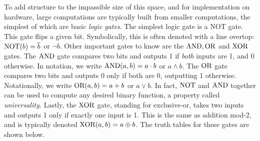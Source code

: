 \documentclass{article}
\newcommand{\NOT}{\ensuremath\text{NOT}}
\newcommand{\AND}{\ensuremath\text{AND}}
\newcommand{\OR}{\ensuremath\text{OR}}
\newcommand{\XOR}{\ensuremath\text{XOR}}
\begin{document}
To add structure to the impassible size of this space, and for implementation on hardware, large computations are typically built from smaller computations, the simplest of which are basic \textit{logic gates}. The simplest logic gate is a NOT gate. This gate flips a given bit. Symbolically, this is often denoted with a line overtop: $\NOT(b) = \overline b$ or $\neg b$. Other important gates to know are the $\AND, \OR$ and $\XOR$ gates. The $\AND$ gate compares two bits and outputs 1 if \textit{both} inputs are 1, and 0 otherwise. In notation, we write $\AND(a,b) = a \cdot b$ or $a \wedge b$. The $\OR$ gate compares two bits and outputs 0 only if both are 0, outputting 1 otherwise. Notationally, we write $\OR(a,b) = a+b$ or $a \vee b$. In fact, $\NOT$ and $\AND$ together can be used to compute any desired binary function, a property called \textit{universality.} Lastly, the $\XOR$ gate, standing for exclusive-or, takes two inputs and outputs 1 only if exactly one input is 1. This is the same as addition mod-2, and is typically denoted $\XOR(a,b) = a \oplus b$. The truth tables for these gates are shown below.
\end{document}
